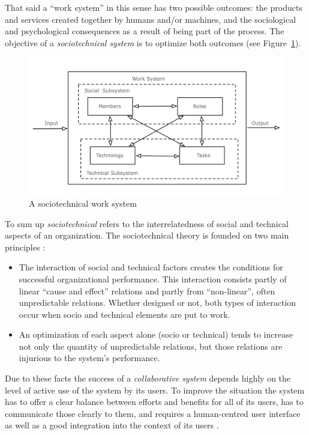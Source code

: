 That said a ``work system'' in this sense has two possible outcomes: the products and services created together by humans and/or machines, and the sociological and psychological consequences as a result of being part of the process. The objective of a \emph{sociotechnical system} is to optimize both outcomes (see Figure~\ref{fig:images_sociotechnical_system}). \@

\begin{figure}[H]
  \centering
  \includegraphics[width=0.9\columnwidth]{images/sociotechnical_system.png}
  \caption[A sociotechnical work system]{A sociotechnical work system \citep[pg. 29]{sydow1985}}
\label{fig:images_sociotechnical_system}
\end{figure}

To sum up \emph{sociotechnical} refers to the interrelatedness of social and technical aspects of an organization. The sociotechnical theory is founded on two main principles \citep{Koch2008}: \@

\begin{itemize}
  \item The interaction of social and technical factors creates the conditions for successful organizational performance. This interaction consists partly of linear ``cause and effect'' relations and partly from ``non-linear'', often unpredictable relations. Whether designed or not, both types of interaction occur when socio and technical elements are put to work.
  \item An optimization of each aspect alone (socio or technical) tends to increase not only the quantity of unpredictable relations, but those relations are injurious to the system's performance.
\end{itemize}

Due to these facts the success of a \emph{collaborative system} depends highly on the level of active use of the system by its users. To improve the situation the system has to offer a clear balance between efforts and benefits for all of its users, has to communicate those clearly to them, and requires a human-centred user interface as well as a good integration into the context of its users \citep{Koch2008}.

